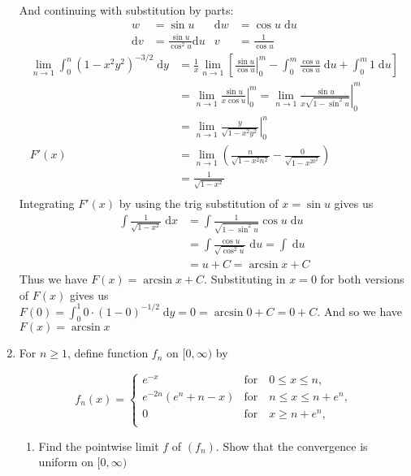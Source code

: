 \documentclass[letterpaper]{article}
\begin{document}
\begin{enumerate}
\begin{align*}
\end{align*}
And continuing with substitution by parts:
\begin{align*}
  w&=\sin u&\mathrm{d}w&=\cos u\;\mathrm{d}u\\
  \mathrm{d}v&=\frac{\sin u}{\cos^2u}\mathrm{d}u&v&=\frac{1}{\cos u}
\end{align*}
\begin{align*}
  \lim_{n\to 1}\int_0^n{(1-x^2y^2)^{-3/2}\;\mathrm{d}y}
  &=\frac{1}{x}\lim_{n\to 1}\left[\left.\frac{\sin u}{\cos u}\right|_0^m-\int_0^m{\frac{\cos u}{\cos u}\;\mathrm{d}u}+\int_0^m{1\;\mathrm{d}u}\right]\\
  &=\lim_{n\to 1}\left.\frac{\sin u}{x\cos u}\right|_0^m
  =\lim_{n\to 1}\left.\frac{\sin u}{x\sqrt{1-\sin^2u}}\right|_0^m\\
  &=\lim_{n\to 1}\left.\frac{y}{\sqrt{1-x^2y^2}}\right|_0^n\\
  F'(x)
  &=\lim_{n\to 1}\left(\frac{n}{\sqrt{1-x^2n^2}}-\frac{0}{\sqrt{1-x^20^2}}\right)\\
  &=\frac{1}{\sqrt{1-x^2}}\\
\end{align*}
Integrating $F'(x)$ by using the trig substitution of $x=\sin u$ gives us
\begin{align*}
  \int{\frac{1}{\sqrt{1-x^2}}\;\mathrm{d}x}
  &=\int{\frac{1}{\sqrt{1-\sin^2u}}\cos u\;\mathrm{d}u}\\
  &=\int{\frac{\cos u}{\sqrt{\cos^2u}}\;\mathrm{d}u}=\int{\;\mathrm{d}u}\\
  &=u+C=\arcsin x+C
\end{align*}
Thus we have $F(x)=\arcsin x+C$. Substituting in $x=0$ for both versions of $F(x)$ gives us $F(0)=\int_0^1{0\cdot(1-0)^{-1/2}\;\mathrm{d}y}=0=\arcsin 0+C=0+C$. And so we have $F(x)=\arcsin x$
\item
For $n\ge 1$, define function $f_n$ on $[0,\infty)$ by

\[
f_n(x)
  =\begin{cases}
  e^{-x}&\text{for}\quad0\le x\le n,\\
  e^{-2n}(e^n+n-x)&\text{for}\quad n\le x\le n+e^n,\\
  0&\text{for}\quad x\ge n+e^n,\\
  \end{cases}
\]
  \begin{enumerate}
  \item
  Find the pointwise limit $f$ of $(f_n)$. Show that the convergence is uniform on $[0,\infty)$


\end{enumerate}
\end{enumerate}
\end{document}
